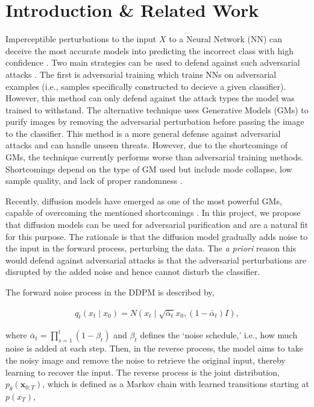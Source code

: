 \section{Introduction \& Related Work}
Imperceptible perturbations to the input $X$ to a Neural Network (NN) can deceive the most accurate models into predicting the incorrect class with high confidence \cite{szegedy2013intriguing}. Two main strategies can be used to defend against such adversarial attacks \cite{DiffPure}. The first is adversarial training which trains NNs on adversarial examples (i.e., samples specifically constructed to decieve a given classifier). However, this method can only defend against the attack types the model was trained to withstand. The alternative technique uses Generative Models (GMs) to purify images by removing the adversarial perturbation before passing the image to the classifier. This method is a more general defense against adversarial attacks and can handle unseen threats. However, due to the shortcomings of GMs, the technique currently performs worse than adversarial training methods. Shortcomings depend on the type of GM used but include mode collapse, low sample quality, and lack of proper randomness \cite{DiffPure}.

Recently, diffusion models have emerged as one of the most powerful GMs, capable of overcoming the mentioned shortcomings \cite{DiffusionPaper}. In this project, we propose that diffusion models can be used for adversarial purification and are a natural fit for this purpose. The rationale is that the diffusion model gradually adds noise to the input in the forward process, perturbing the data. The \textit{a priori} reason this would defend against adversarial attacks is that the adversarial perturbations are disrupted by the added noise and hence cannot disturb the classifier. 

The forward noise process in the DDPM is described by,

\begin{align}
    q_t\left(x_t \mid x_0\right)=N\left(x_t \mid \sqrt{\bar{\alpha}_t} x_0,\left(1-\bar{\alpha}_t\right) I\right),
\end{align}

where $\bar{\alpha}_t=\prod_{s=1}^t\left(1-\beta_t\right)$ and $\beta_t$ defines the `noise schedule,' i.e., how much noise is added at each step. Then, in the reverse process, the model aims to take the noisy image and remove the noise to retrieve the original input, thereby learning to recover the input. The reverse process is the joint distribution, $p_\theta\left(\mathbf{x}_{0: T}\right)$, which is defined as a Markov chain with learned transitions starting at $p(x_T)$,


